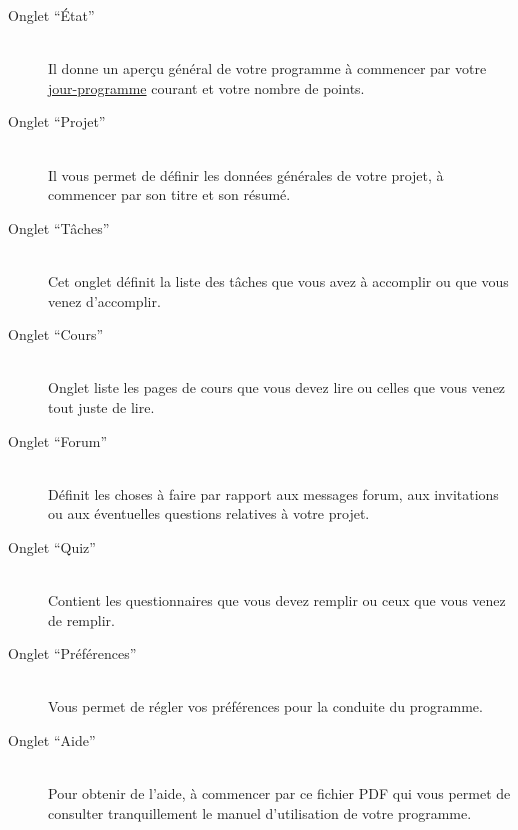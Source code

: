 \begin{description}
\item[Onglet ``État''] \hfill \\
 Il donne un aperçu général de votre programme à commencer par votre \hyperlink{explicationjourprogrammejourreel}{jour-programme} courant et votre nombre de points.



\item[Onglet ``Projet''] \hfill \\
 Il vous permet de définir les données générales de votre projet, à commencer par son titre et son résumé.



\item[Onglet ``Tâches''] \hfill \\
 Cet onglet définit la liste des tâches que vous avez à accomplir ou que vous venez d'accomplir.



\item[Onglet ``Cours''] \hfill \\
 Onglet liste les pages de cours que vous devez lire ou celles que vous venez tout juste de lire.



\item[Onglet ``Forum''] \hfill \\
 Définit les choses à faire par rapport aux messages forum, aux invitations ou aux éventuelles questions relatives à votre projet.



\item[Onglet ``Quiz''] \hfill \\
 Contient les questionnaires que vous devez remplir ou ceux que vous venez de remplir.



\item[Onglet ``Préférences''] \hfill \\
 Vous permet de régler vos préférences pour la conduite du programme.



\item[Onglet ``Aide''] \hfill \\
 Pour obtenir de l'aide, à commencer par ce fichier PDF qui vous permet de consulter tranquillement le manuel d'utilisation de votre programme.
\end{description}
